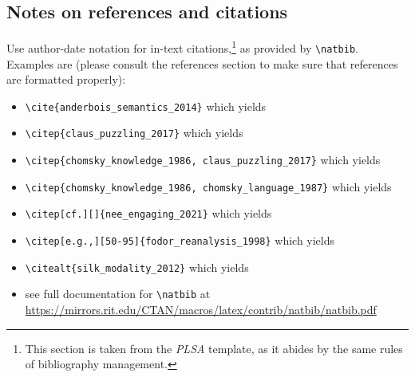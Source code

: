 \subsection{Notes on references and citations}  \label{ref}
Use author-date notation for in-text citations,\footnote{This section is taken from the \textit{PLSA} template, as it abides by the same rules of bibliography management.} as provided by \verb=\natbib=. Examples are (please consult the references section to make sure that references are formatted properly):
\begin{itemize}
    \item \verb=\cite{anderbois_semantics_2014}= which yields \cite{anderbois_semantics_2014}
    \item \verb=\citep{claus_puzzling_2017}= which yields \citep{claus_puzzling_2017}
    \item \verb=\citep{chomsky_knowledge_1986, claus_puzzling_2017}= which yields \citep{chomsky_knowledge_1986, claus_puzzling_2017}
    \item \verb=\citep{chomsky_knowledge_1986, chomsky_language_1987}= which yields \citep{chomsky_knowledge_1986, chomsky_language_1987}
    \item \verb=\citep[cf.][]{nee_engaging_2021}= which yields \citep[cf.][]{nee_engaging_2021}
    \item \verb=\citep[e.g.,][50-95]{fodor_reanalysis_1998}= which yields \citep[e.g.,][50-95]{fodor_reanalysis_1998}
    \item \verb=\citealt{silk_modality_2012}= which yields \citealt{silk_modality_2012}
    \item see full documentation for \verb=\natbib= at\\ \href{https://mirrors.rit.edu/CTAN/macros/latex/contrib/natbib/natbib.pdf}{https://mirrors.rit.edu/CTAN/macros/latex/contrib/natbib/natbib.pdf}
\end{itemize}


